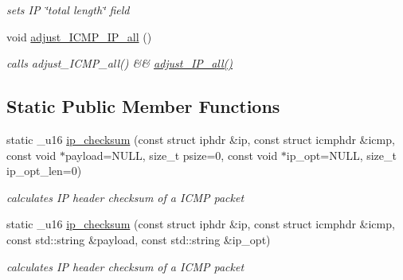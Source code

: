\begin{CompactItemize}
\begin{CompactList}\small\item\em sets IP \char`\"{}total length\char`\"{} field \item\end{CompactList}\item 
\hypertarget{classsocketpp_1_1ICMP__IP__RawSocket_c3f54f7a266586af46e4bfa4494f90d6}{
void \hyperlink{classsocketpp_1_1ICMP__IP__RawSocket_c3f54f7a266586af46e4bfa4494f90d6}{adjust\_\-ICMP\_\-IP\_\-all} ()}
\label{classsocketpp_1_1ICMP__IP__RawSocket_c3f54f7a266586af46e4bfa4494f90d6}

\begin{CompactList}\small\item\em calls adjust\_\-ICMP\_\-all() \&\& \hyperlink{classsocketpp_1_1IP__RawSocket_45e60510233daaa2f279d3a4706fdce5}{adjust\_\-IP\_\-all()} \item\end{CompactList}\end{CompactItemize}
\subsection*{Static Public Member Functions}
\begin{CompactItemize}
\item 
static \_\-u16 \hyperlink{classsocketpp_1_1ICMP__IP__RawSocket_65eb1bc40fd501a49fee9055e22229dc}{ip\_\-checksum} (const struct iphdr \&ip, const struct icmphdr \&icmp, const void $\ast$payload=NULL, size\_\-t psize=0, const void $\ast$ip\_\-opt=NULL, size\_\-t ip\_\-opt\_\-len=0)
\begin{CompactList}\small\item\em calculates IP header checksum of a ICMP packet \item\end{CompactList}\item 
static \_\-u16 \hyperlink{classsocketpp_1_1ICMP__IP__RawSocket_0723a72dc06b401f6dd101a25da6348f}{ip\_\-checksum} (const struct iphdr \&ip, const struct icmphdr \&icmp, const std::string \&payload, const std::string \&ip\_\-opt)
\begin{CompactList}\small\item\em calculates IP header checksum of a ICMP packet \item\end{CompactList}\end{CompactItemize}

